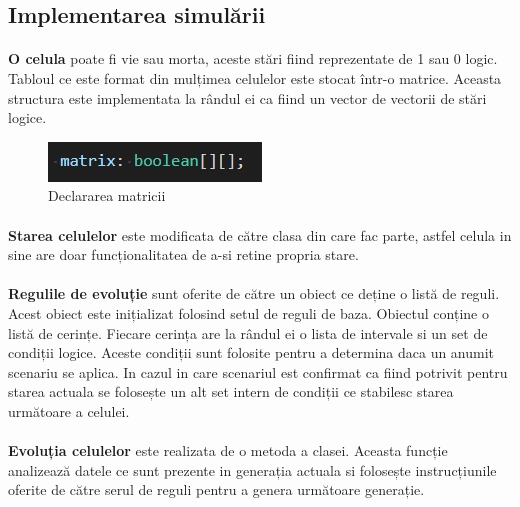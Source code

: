 \documentclass[11pt ,A4]{article}
\begin{document}
        \subsection{Implementarea simulării}
            \paragraph{}
                \textbf{O celula} poate fi vie sau morta, aceste stări fiind reprezentate de 1 sau 0 logic.
                Tabloul ce este format din mulțimea celulelor este stocat într-o matrice. Aceasta structura este implementata la rândul ei ca fiind un vector de vectorii de stări logice. 
                \begin{figure}[h]
                    \centering
                    \includegraphics[scale=0.8]{matrix_matrix_def}
                    \caption{Declararea matricii}
                \end{figure}

            \paragraph{}
                \textbf{Starea celulelor} este modificata de către clasa din care fac parte, astfel celula in sine are doar funcționalitatea de a-si retine propria stare.

            \paragraph{}
                \textbf{Regulile de evoluție} sunt oferite de către un obiect ce deține o listă de reguli.
                Acest obiect este inițializat folosind setul de reguli de baza. Obiectul conține o listă de cerințe.
                Fiecare cerința are la rândul ei o lista de intervale si un set de condiții logice.
                Aceste condiții sunt folosite pentru a determina daca un anumit scenariu se aplica.
                In cazul in care scenariul est confirmat ca fiind potrivit pentru starea actuala se folosește un alt set intern de condiții ce stabilesc starea următoare a celulei.
            
            \paragraph{}
                \textbf{Evoluția celulelor} este realizata de o metoda a clasei.
                Aceasta funcție analizează datele ce sunt prezente in generația actuala si folosește instrucțiunile oferite de către serul de reguli pentru a genera următoare generație.
\end{document}

